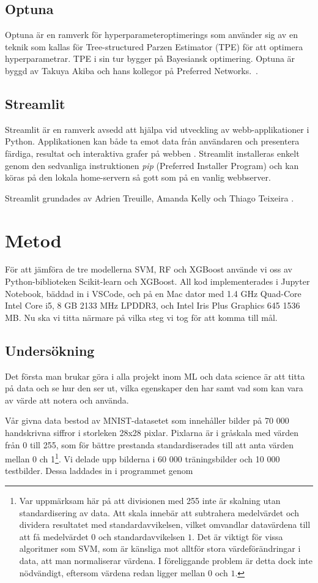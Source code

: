 \documentclass[12pt,a4paper]{article}
\begin{document}
\subsection{Optuna}

Optuna är en ramverk för hyperparameteroptimerings som använder sig av en teknik som kallas för Tree-structured Parzen Estimator (TPE) för att optimera hyperparametrar. TPE i sin tur bygger på Bayesiansk optimering. Optuna är byggd av Takuya Akiba och hans kollegor på Preferred Networks.~\citep{Akiba}.

\subsection{Streamlit}

Streamlit är en ramverk avsedd att hjälpa vid utveckling av webb-applikationer i Python. Applikationen kan både ta emot data från användaren och presentera färdiga, resultat och interaktiva grafer på webben \citep{Richards}. Streamlit installeras enkelt genom den sedvanliga instruktionen \emph{pip} (Preferred Installer Program) och kan köras på den lokala home-servern så gott som på en vanlig webbserver.

Streamlit grundades av Adrien Treuille, Amanda Kelly och Thiago Teixeira \citep{TechCrunch}.

\section{Metod}

För att jämföra de tre modellerna SVM, RF och XGBoost använde vi oss av Python-biblioteken Scikit-learn och XGBoost. All kod implementerades i Jupyter Notebook, bäddad in i VSCode, och på en Mac dator med 1.4 GHz Quad-Core Intel Core i5, 8 GB 2133 MHz LPDDR3, och Intel Iris Plus Graphics 645 1536 MB. Nu ska vi titta närmare på vilka steg vi tog för att komma till mål.

\subsection{Undersökning}

Det första man brukar göra i alla projekt inom ML och data science är att titta på data och se hur den ser ut, vilka egenskaper den har samt vad som kan vara av värde att notera och använda.

Vår givna data bestod av MNIST-datasetet som innehåller bilder på 70 000 handskrivna siffror i storleken 28x28 pixlar. Pixlarna är i gråskala med värden från 0 till 255, som för bättre prestanda standardiserades till att anta värden mellan 0 ch 1\footnote{\footnotesize{Var uppmärksam här på att divisionen med 255 inte är skalning utan standardisering av data. Att skala innebär att subtrahera medelvärdet och dividera resultatet med standardavvikelsen, vilket omvandlar datavärdena till att få medelvärdet $0$ och standardavvikelsen $1$. Det är viktigt för vissa algoritmer som SVM, som är känsliga mot alltför stora värdeförändringar i data, att man normaliserar värdena. I föreliggande problem är detta dock inte nödvändigt, eftersom värdena redan ligger mellan $0$ och $1$.}}. Vi delade upp bilderna i 60 000 träningsbilder och 10 000 testbilder. Dessa laddades in i programmet genom
\end{document}
